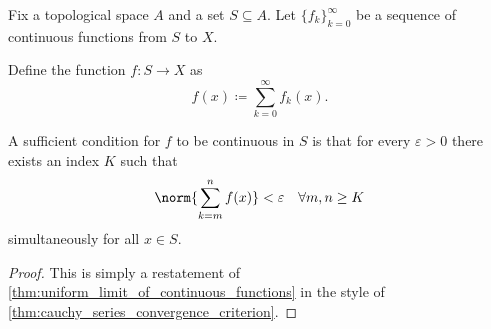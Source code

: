 \begin{proposition}\label{thm:cauchy_series_continuity_criterion}
  Fix a topological space \( A \) and a set \( S \subseteq A \). Let \( \{ f_k \}_{k=0}^\infty \) be a sequence of continuous functions from \( S \) to \( X \).

  Define the function \( f: S \to X \) as
  \begin{equation}\label{thm:cauchy_series_continuity_criterion/function}
    f(x) \coloneqq \sum_{k=0}^\infty f_k(x).
  \end{equation}

  A sufficient condition for \( f \) to be continuous in \( S \) is that for every \( \varepsilon > 0 \) there exists an index \( K \) such that
  \begin{equation*}
    \norm{\sum_{k=m}^n f(x)} < \varepsilon \quad\forall m, n \geq K
  \end{equation*}
  simultaneously for all \( x \in S \).
\end{proposition}
\begin{proof}
  This is simply a restatement of \cref{thm:uniform_limit_of_continuous_functions} in the style of \cref{thm:cauchy_series_convergence_criterion}.
\end{proof}

